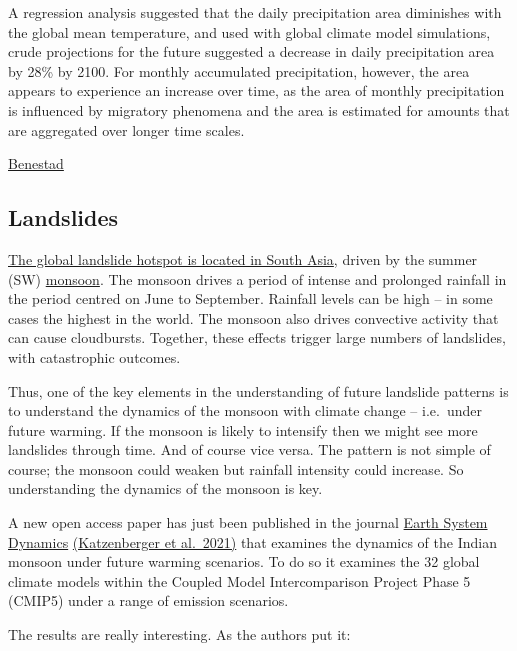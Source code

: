 \documentclass[
]{book}
\begin{document}
A regression analysis suggested that the daily precipitation area diminishes with the global mean temperature, and used with global climate model simulations, crude projections for the future suggested a decrease in daily precipitation area by 28\% by 2100. For monthly accumulated precipitation, however, the area appears to experience an increase over time, as the area of monthly precipitation is influenced by migratory phenomena and the area is estimated for amounts that are aggregated over longer time scales.

\href{https://iopscience.iop.org/article/10.1088/1748-9326/aab375}{Benestad}

\hypertarget{landslides}{%
\subsection{Landslides}\label{landslides}}

\href{https://blogs.agu.org/landslideblog/2018/08/24/global-fatal-landslide-occurrence-1/}{The global landslide hotspot is located in South Asia}, driven by the summer (SW) \href{https://blogs.agu.org/landslideblog/?s=monsoon\&submit.x=0\&submit.y=0\&mswhere=blog}{monsoon}. The monsoon drives a period of intense and prolonged rainfall in the period centred on June to September. Rainfall levels can be high -- in some cases the highest in the world. The monsoon also drives convective activity that can cause cloudbursts. Together, these effects trigger large numbers of landslides, with catastrophic outcomes.

Thus, one of the key elements in the understanding of future landslide patterns is to understand the dynamics of the monsoon with climate change -- i.e.~under future warming. If the monsoon is likely to intensify then we might see more landslides through time. And of course vice versa. The pattern is not simple of course; the monsoon could weaken but rainfall intensity could increase. So understanding the dynamics of the monsoon is key.

A new open access paper has just been published in the journal \href{https://www.earth-system-dynamics.net/}{Earth System Dynamics} \href{https://esd.copernicus.org/articles/12/367/2021/}{(Katzenberger et al.~2021)} that examines the dynamics of the Indian monsoon under future warming scenarios. To do so it examines the 32 global climate models within the Coupled Model Intercomparison Project Phase 5 (CMIP5) under a range of emission scenarios.

The results are really interesting. As the authors put it:
\end{document}
